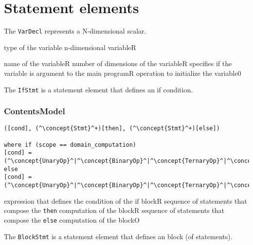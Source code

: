 \section{Statement elements}


The {\tt VarDecl} represents a N-dimensional scalar.

\begin{HIRChildElements}
	{type of the variable n-dimensional variable}{R}
\end{HIRChildElements}

\begin{HIRAttributes}
	{name of the variable}{R}
	{number of dimensions of the variable}{R}
    {specifies if the variable is argument to the main program}{R}
	{operation to initialize the variable}{0}
\end{HIRAttributes}

The {\tt IfStmt} is a statement element that defines an if condition.

\subsubsection*{ContentsModel}{}

\begin{lstlisting}[style=default]
([cond], (^\concept{Stmt}^+)[then], (^\concept{Stmt}^+)[else])

where if (scope == domain_computation)
[cond] = (^\concept{UnaryOp}^|^\concept{BinaryOp}^|^\concept{TernaryOp}^|^\concept{FieldAccess}^|^\concept{VarAccess}^|^\concept{Literal}^)
else
[cond] = (^\concept{UnaryOp}^|^\concept{BinaryOp}^|^\concept{TernaryOp}^|^\concept{VarAccess}^|^\concept{Literal}^)
\end{lstlisting}

\begin{HIRChildElements}
	{expression that defines the condition of the if block}{R}
	{sequence of statements that compose the {\tt then} computation of the block}{R}
	{sequence of statements that compose the {\tt else} computation of the block}{O}
\end{HIRChildElements}

The {\tt BlockStmt} is a statement element that defines an block (of statements).

